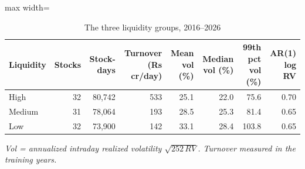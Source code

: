 \begin{table}[htbp]
\centering
\caption{The three liquidity groups, 2016--2026}
\label{tab:desc}
\small
\begin{adjustbox}{max width=\textwidth}
\begin{tabular}{lrrrrrrr}
\toprule
Liquidity & Stocks & Stock-days & Turnover (Rs cr/day) & Mean vol (\%) & Median vol (\%) & 99th pct vol (\%) & AR(1) log RV \\
\midrule
High & 32 & 80,742 & 533 & 25.1 & 22.0 & 75.6 & 0.70 \\
Medium & 31 & 78,064 & 193 & 28.5 & 25.3 & 81.4 & 0.65 \\
Low & 32 & 73,900 & 142 & 33.1 & 28.4 & 103.8 & 0.65 \\
\bottomrule
\end{tabular}
\end{adjustbox}
\par\smallskip\parbox{0.95\textwidth}{\footnotesize\itshape Vol = annualized intraday realized volatility $\sqrt{252\,RV}$. Turnover measured in the training years.}
\end{table}
